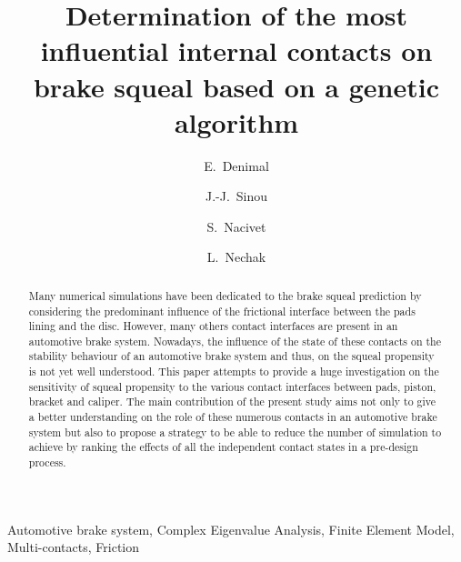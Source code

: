 \documentclass[final,1p]{elsarticle}
\begin{document}
\begin{frontmatter}

\title{Determination of the most influential internal contacts on brake squeal based on a genetic algorithm}

\author[LTDS,PSA,a1]{E.~Denimal}
\author[LTDS,IUF,a4]{J.-J.~Sinou}
\author[PSA,a3]{S.~Nacivet}
\author[LTDS,a2]{L.~Nechak}


\address[LTDS]{Laboratoire de Tribologie et Dynamique des Syst\`emes, UMR CNRS 5513,
\'Ecole Centrale de Lyon, 36 avenue Guy de Collongue 69134 \'Ecully Cedex, France}
\address[PSA]{PSA Peugeot Citro\"en, Centre technique de la Garenne Colombes, 18 rue des Fauvelles, 92250 La Garenne Colombes, France}
\address[IUF]{Institut Universitaire de France, 75005 Paris, France}
\address[a1]{enora.denimal@doctorant.ec-lyon.fr}
\address[a2]{lyes.nechak@ec-lyon.fr}
\address[a4]{jean-jacques.sinou@ec-lyon.fr}
\address[a3]{samuel.nacivet@mpsa.com}

\begin{abstract}
Many numerical simulations have been dedicated to the brake squeal prediction by considering  the predominant influence of the frictional interface between the pads lining and the disc. However, many others contact interfaces are present in an automotive brake system. Nowadays, the influence of the state of these contacts on the stability behaviour of an automotive brake system and thus, on the squeal propensity is not yet well understood.
This paper attempts to provide a huge investigation on the sensitivity of squeal propensity to the various contact interfaces between pads, piston, bracket and caliper. The main contribution of the present study aims not only to give a better understanding on the role of these numerous contacts in an automotive brake system but also to propose a strategy to be able to reduce the number of simulation to achieve by ranking the effects of all the independent contact states in a pre-design process.

\end{abstract}

\begin{keyword}
Automotive brake system, Complex Eigenvalue Analysis, Finite Element Model, Multi-contacts, Friction
\end{keyword}

\end{frontmatter}

\linenumbers
\end{document}

